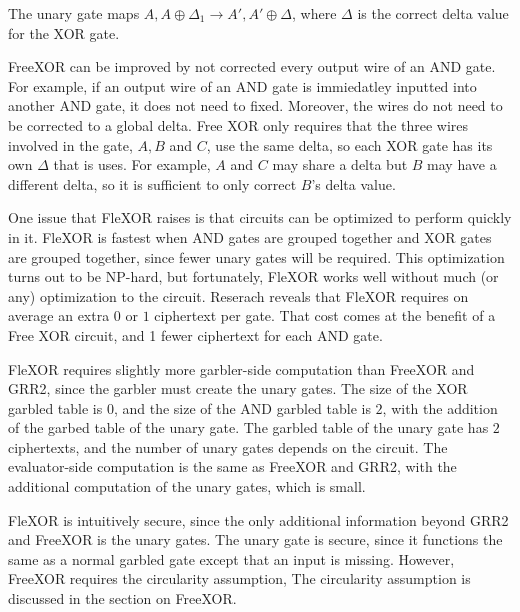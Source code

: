 The unary gate maps $A,A \oplus \Delta_1 \to A', A' \oplus \Delta$, where $\Delta$ is the correct delta value for the XOR gate.

FreeXOR can be improved by not corrected every output wire of an AND gate.
For example, if an output wire of an AND gate is immiedatley inputted into another AND gate, it does not need to fixed.
Moreover, the wires do not need to be corrected to a global delta.
Free XOR only requires that the three wires involved in the gate, $A, B$ and $C$, use the same delta, so each XOR gate has its own $\Delta$ that is uses. 
For example, $A$ and $C$ may share a delta but $B$ may have a different delta, so it is sufficient to only correct $B$'s delta value.

One issue that FleXOR raises is that circuits can be optimized to perform quickly in it. 
FleXOR is fastest when AND gates are grouped together and XOR gates are grouped together, since fewer unary gates will be required.
This optimization turns out to be NP-hard, but fortunately, FleXOR works well without much (or any) optimization to the circuit.
Reserach reveals that FleXOR requires on average an extra $0$ or $1$ ciphertext per gate.
That cost comes at the benefit of a Free XOR circuit, and 1 fewer ciphertext for each AND gate.

FleXOR requires slightly more garbler-side computation than FreeXOR and GRR2, since the garbler must create the unary gates.
The size of the XOR garbled table is $0$, and the size of the AND garbled table is $2$, with the addition of the garbed table of the unary gate.
The garbled table of the unary gate has $2$ ciphertexts, and the number of unary gates depends on the circuit.
The evaluator-side computation is the same as FreeXOR and GRR2, with the additional computation of the unary gates, which is small.

FleXOR is intuitively secure, since the only additional information beyond GRR2 and FreeXOR is the unary gates.
The unary gate is secure, since it functions the same as a normal garbled gate except that an input is missing.
However, FreeXOR requires the circularity assumption, 
The circularity assumption is discussed in the section on FreeXOR.


